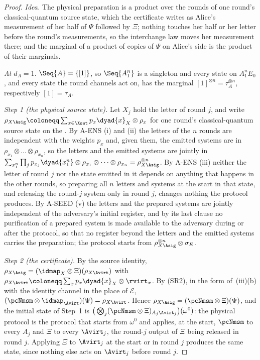 \begin{proof}
\emph{Idea.} The physical preparation is a product over the rounds of one
round's classical-quantum source state, which the certificate writes as
Alice's measurement of her half of $\Psi$ followed by $\Xi$; nothing touches
her half or her letter before the round's measurements, so the interchange
law moves her measurement there; and the marginal of a product of copies of
$\Psi$ on Alice's side is the product of their marginals.

\emph{At $d_A=1$.} $\Seq{A}=\{[1]\}$, so $\Seq{A_1^n}$ is a singleton and
every state on $A_1^nE_0$, and every state the round channels act on, has the
marginal $[1]^{\otimes n}=\tau_A^{\otimes n}$, respectively $[1]=\tau_A$.

\emph{Step 1 (the physical source state).} Let $X_j$ hold the letter of
round $j$, and write
$\rho_{X\Asig}\coloneqq\sum_{x\in\Xset}p_x\dyad{x}_X\otimes\rho_x$ for one
round's classical-quantum source state on the . By
A-ENS (i) and (ii) the letters of the $n$ rounds are independent with the
weights $p_x$ and, given them, the emitted systems are in
$\rho_{x_1}\otimes\dots\otimes\rho_{x_n}$, so the letters and the emitted
systems are jointly in
$\sum_{x_1^n}\prod_jp_{x_j}\dyad{x_1^n}\otimes\rho_{x_1}\otimes\dots\otimes
\rho_{x_n}=\rho_{X\Asig}^{\otimes n}$. By A-ENS (iii) neither the letter of
round $j$ nor the state emitted in it depends on anything that happens in the
other rounds, so preparing all $n$ letters and systems at the start in that
state, and releasing the round-$j$ system only in round $j$, changes nothing
the protocol produces. By A-SEED (v) the letters and the prepared systems
are jointly independent of the adversary's initial register, and by its last
clause no purification of a prepared system is made available to the
adversary during or after the protocol, so that no register beyond the
letters and the emitted systems carries the preparation; the protocol
starts from $\rho_{X\Asig}^{\otimes n}\otimes\sigma_E$.

\emph{Step 2 (the certificate).} By the source identity,
$\rho_{X\Asig}=(\idmap_X\otimes\Xi)(\rho_{X\Avirt})$ with
$\rho_{X\Avirt}\coloneqq\sum_xp_x\dyad{x}_X\otimes\rvirt_x$. By (SR2), in the
form of \,(iii)(b) with the
identity channel in the place of $\mathcal{E}$,
$(\pcNmsm\otimes\idmap_{\Avirt})(\Psi)=\rho_{X\Avirt}$. Hence
$\rho_{X\Asig}=(\pcNmsm\otimes\Xi)(\Psi)$, and the initial state of Step~1 is
$\big(\bigotimes_j(\pcNmsm\otimes\Xi)_{A_j\Avirt_j}\big)(\omega^{0})$: the
physical protocol is the protocol that starts from $\omega^{0}$ and applies,
at the start, $\pcNmsm$ to every $A_j$ and $\Xi$ to every $\Avirt_j$, the
round-$j$ output of $\Xi$ being released in round $j$. Applying $\Xi$ to
$\Avirt_j$ at the start or in round $j$ produces the same state, since
nothing else acts on $\Avirt_j$ before round $j$.


\end{proof}
